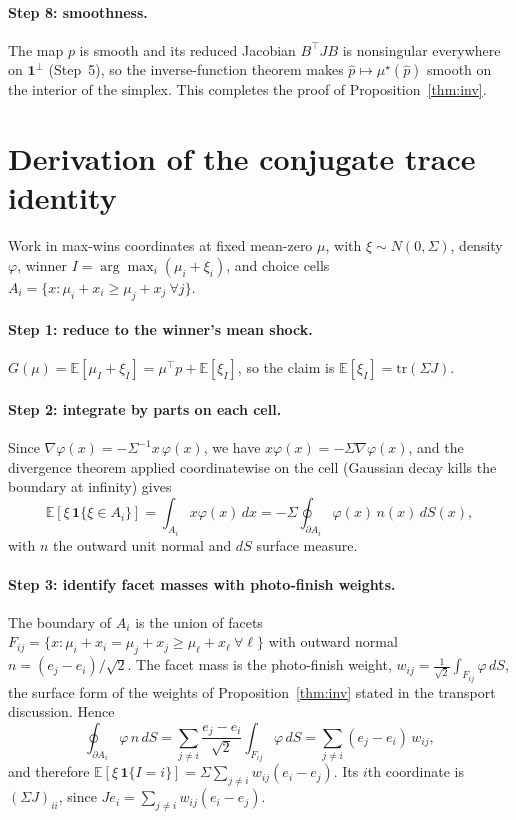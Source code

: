 \documentclass[12pt]{article}
\theoremstyle{remark}
\newcommand{\E}{\mathbb{E}}
\begin{document}
\paragraph{Step 8: smoothness.} The map $p$ is smooth and its reduced
Jacobian $B^\top J B$ is nonsingular everywhere on $\mathbf{1}^\perp$
(Step~5), so the inverse-function theorem makes $\hat p\mapsto
\mu^\star(\hat p)$ smooth on the interior of the simplex. This completes
the proof of Proposition~\ref{thm:inv}.

\section{Derivation of the conjugate trace identity}\label{app:trace}

Work in max-wins coordinates at fixed mean-zero $\mu$, with $\xi \sim
N(0, \Sigma)$, density $\varphi$, winner $I = \arg\max_i (\mu_i +
\xi_i)$, and choice cells $A_i = \{x : \mu_i + x_i \ge \mu_j + x_j
\ \forall j\}$.

\paragraph{Step 1: reduce to the winner's mean shock.} $G(\mu) =
\E[\mu_I + \xi_I] = \mu^\top p + \E[\xi_I]$, so the claim is
$\E[\xi_I] = \mathrm{tr}(\Sigma J)$.

\paragraph{Step 2: integrate by parts on each cell.} Since
$\nabla \varphi(x) = -\Sigma^{-1} x\, \varphi(x)$, we have $x
\varphi(x) = -\Sigma \nabla\varphi(x)$, and the divergence theorem
applied coordinatewise on the cell (Gaussian decay kills the boundary
at infinity) gives
\[
\E[\xi\, \mathbf{1}\{\xi \in A_i\}]
= \int_{A_i} x \varphi(x)\,dx
= -\Sigma \oint_{\partial A_i} \varphi(x)\, n(x)\, dS(x),
\]
with $n$ the outward unit normal and $dS$ surface measure.

\paragraph{Step 3: identify facet masses with photo-finish weights.}
The boundary of $A_i$ is the union of facets $F_{ij} = \{x : \mu_i +
x_i = \mu_j + x_j \ge \mu_\ell + x_\ell \ \forall \ell\}$ with
outward normal $n = (e_j - e_i)/\sqrt2$. The facet mass is the
photo-finish weight, $w_{ij} = \tfrac{1}{\sqrt2}\int_{F_{ij}}
\varphi\, dS$, the surface form of the weights of
Proposition~\ref{thm:inv} stated in the transport discussion. Hence
\[
\oint_{\partial A_i} \varphi\, n\, dS
= \sum_{j \ne i} \frac{e_j - e_i}{\sqrt2} \int_{F_{ij}} \varphi\, dS
= \sum_{j\ne i} (e_j - e_i)\, w_{ij},
\]
and therefore $\E[\xi\, \mathbf{1}\{I = i\}] = \Sigma \sum_{j \ne
i} w_{ij} (e_i - e_j)$. Its $i$th coordinate is $(\Sigma J)_{ii}$,
since $J e_i = \sum_{j \ne i} w_{ij}(e_i - e_j)$.
\end{document}
